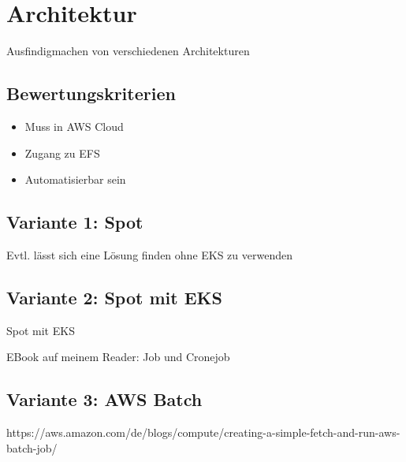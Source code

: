 \section{Architektur}
Ausfindigmachen von verschiedenen Architekturen
\subsection{Bewertungskriterien}
\begin{itemize}
\item Muss in AWS Cloud
\item Zugang zu EFS
\item Automatisierbar sein
\end{itemize}
\subsection{Variante 1: Spot}
Evtl. lässt sich eine Lösung finden ohne EKS zu verwenden

\subsection{Variante 2: Spot mit EKS}
Spot mit EKS

EBook auf meinem Reader: Job und Cronejob

\subsection{Variante 3: AWS Batch}

https://aws.amazon.com/de/blogs/compute/creating-a-simple-fetch-and-run-aws-batch-job/
